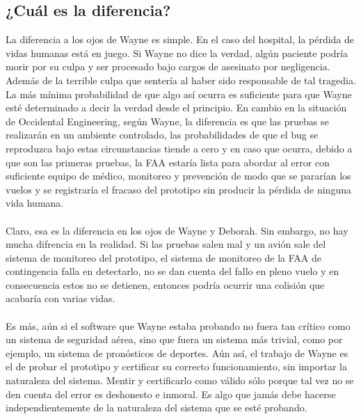 \documentclass{article}
\begin{document}
\subsection{¿Cuál es la diferencia?}
La diferencia a los ojos de Wayne es simple. En el caso del hospital,
la pérdida de vidas humanas está en juego. Si Wayne no dice la verdad,
algún paciente podría morir por su culpa y ser procesado bajo
cargos de asesinato por negligencia. Además de la terrible culpa
que sentería al haber sido responsable de tal tragedia. La más 
mínima probabilidad de que algo así ocurra es suficiente para que 
Wayne esté determinado a decir la verdad desde el principio. En 
cambio en la situación de Occidental Engineering, según Wayne, 
la diferencia es que las pruebas se realizarán en un ambiente
controlado, las probabilidades de que el bug se reproduzca bajo 
estas circunstancias tiende a cero y en caso que ocurra, debido a que
son las primeras pruebas, la FAA estaría lista para abordar al error
con suficiente equipo de médico, monitoreo y prevención de modo
que se pararían los vuelos y se registraría el fracaso del prototipo
sin producir la pérdida de ninguna vida humana. \\\\
Claro, esa es la diferencia en los ojos de Wayne y Deborah. Sin 
embargo, no hay mucha difrencia en la realidad. Si las pruebas salen
mal y un avión sale del sistema de monitoreo del prototipo, el sistema
de monitoreo de la FAA de contingencia falla en detectarlo, no se dan
cuenta del fallo en pleno vuelo y en consecuencia estos no 
se detienen, entonces podría ocurrir una colisión que acabaría 
con varias vidas. \\\\
Es más, aún si el software que Wayne estaba probando no fuera tan
crítico como un sistema de seguridad aérea, sino que fuera un 
sistema más trivial, como por ejemplo, un sistema de pronósticos 
de deportes. Aún así, el trabajo de Wayne es el de probar el prototipo
y certificar su correcto funcionamiento, sin importar la naturaleza
del sistema. Mentir y certificarlo como válido sólo porque tal vez
no se den cuenta del error es deshonesto e inmoral. Es algo que 
jamás debe hacerse independientemente de la naturaleza del sistema
que se esté probando.
\end{document}
